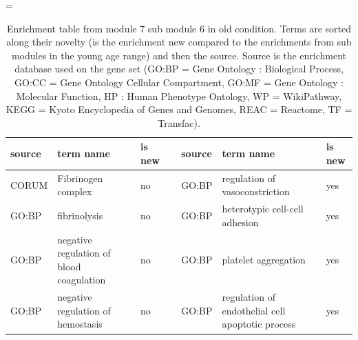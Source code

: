\LTcapwidth=\textwidth
\begin{longtable}{@{}lp{5cm}lllp{5cm}l@{}}
\caption{Enrichment table from module 7 sub module 6 in old condition. Terms are sorted along their novelty (is the enrichment new compared to the enrichments from sub modules in the young age range) and then the source. Source is the enrichment database used on the gene set (GO:BP = Gene Ontology : Biological Process, GO:CC = Gene Ontology Cellular Compartment, GO:MF = Gene Ontology : Molecular Function, HP : Human Phenotype Ontology, WP = WikiPathway, KEGG = Kyoto Encyclopedia of Genes and Genomes, REAC = Reactome, TF = Transfac).}
\\ \hline
\textbf{source} & \textbf{term name}                                                                                                                & \textbf{is new} & \textbf{} & \textbf{source} & \textbf{term name}                                                                                                                                                    & \textbf{is new} \\ \hline
CORUM           & Fibrinogen complex                                                                                                                 & no               &           & GO:BP           & regulation of vasoconstriction                                                                                                                                         & yes              \\
GO:BP           & fibrinolysis                                                                                                                       & no               &           & GO:BP           & heterotypic cell-cell adhesion                                                                                                                                         & yes              \\
GO:BP           & negative regulation of blood coagulation                                                                                           & no               &           & GO:BP           & platelet aggregation                                                                                                                                                   & yes              \\
GO:BP           & negative regulation of hemostasis                                                                                                  & no               &           & GO:BP           & regulation of endothelial cell apoptotic process                                                                                                                       & yes              \\

\end{longtable}
